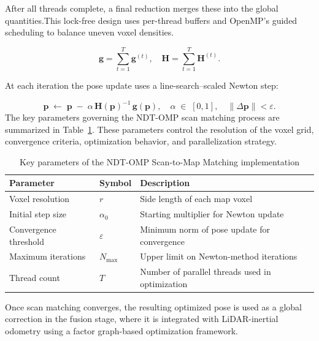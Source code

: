 After all threads complete, a final reduction merges these into the global quantities.This lock-free design uses per-thread buffers and OpenMP’s guided scheduling to balance uneven voxel densities.


\begin{equation}
	\label{eq:reduction}
	\mathbf{g} = \sum_{t=1}^T \mathbf{g}^{(t)},
	\quad
	\mathbf{H} = \sum_{t=1}^T \mathbf{H}^{(t)}.
\end{equation}


At each iteration the pose update uses a line-search–scaled Newton step:

\begin{equation}
	\label{eq:update}
	\mathbf{p} \;\leftarrow\; \mathbf{p} \;-\; \alpha \,\mathbf{H}(\mathbf{p})^{-1}\,\mathbf{g}(\mathbf{p}),
	\quad
	\alpha \;\in\; [0,1], 
	\quad
	\|\Delta\mathbf{p}\|<\varepsilon.
\end{equation}
The key parameters governing the NDT-OMP scan matching process are summarized in Table~\ref{tab:ndt-omp-params}. These parameters control the resolution of the voxel grid, convergence criteria, optimization behavior, and parallelization strategy.

\begin{table}[ht]
	\centering
	\renewcommand{\arraystretch}{1.1}
	\setlength{\tabcolsep}{6pt}
	\caption{Key parameters of the NDT-OMP Scan-to-Map Matching implementation}
	\label{tab:ndt-omp-params}
	\begin{tabular}{@{}lll@{}}
		\toprule
		\textbf{Parameter}         & \textbf{Symbol}       & \textbf{Description} \\ 
		\midrule
		Voxel resolution           & \(r\)                 & Side length of each map voxel \\ 
		Initial step size          & \(\alpha_0\)          & Starting multiplier for Newton update \\ 
		Convergence threshold      & \(\varepsilon\)       & Minimum norm of pose update for convergence \\ 
		Maximum iterations         & \(N_{\max}\)          & Upper limit on Newton-method iterations \\ 
		Thread count               & \(T\)                 & Number of parallel threads used in optimization \\ 
		\bottomrule
	\end{tabular}
\end{table}

Once scan matching converges, the resulting optimized pose is used as a global correction in the fusion stage, where it is integrated with LiDAR-inertial odometry using a factor graph-based optimization framework.




